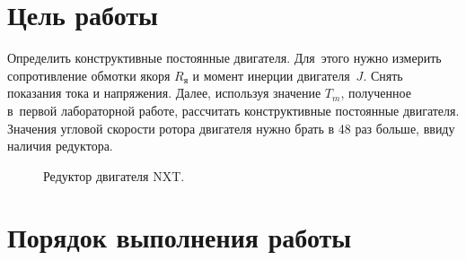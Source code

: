 \documentclass[12pt,a4paper,openany]{extarticle}
\begin{document}
\section{Цель работы}
Определить конструктивные постоянные двигателя. Для~этого нужно измерить сопротивление обмотки якоря $R_\textit{я}$ и момент инерции двигателя~$J$.
Снять показания тока и напряжения. Далее, используя значение $T_m$, полученное в~первой лабораторной работе, рассчитать конструктивные постоянные двигателя. Значения угловой скорости ротора двигателя нужно брать в 48 раз больше, ввиду наличия редуктора.
\begin{figure}[H]
	\noindent{}
	\caption{Редуктор двигателя NXT.}
	\label{fig:transmition}
\end{figure}

\section{Порядок выполнения работы}
\end{document}
